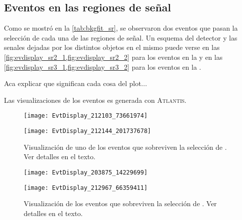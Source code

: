 \subsection{Eventos en las regiones de señal}

Como se mostró en la \cref{tab:bkgfit_sr}, se observaron dos eventos que pasan la selección de cada una de las regiones de
señal.
Un esquema del detector y las senales dejadas por los distintos objetos en el mismo puede verse en las
\cref{fig:evdisplay_sr2_1,fig:evdisplay_sr2_2} para los eventos en la {\SRL} y en las
\cref{fig:evdisplay_sr3_1,fig:evdisplay_sr3_2} para los eventos en la {\SRH}.

Aca explicar que significan cada cosa del plot...


Las visualizaciones
de los eventos es generada con \textsc{Atlantis}\cite{atlantis}.


\begin{figure}[!htbp]
  \begin{center}

    \texttt{[image: EvtDisplay\_212103\_73661974]}

    \vspace{1cm}

    \texttt{[image: EvtDisplay\_212144\_201737678]}

    \caption{Visualización de uno de los eventos que sobreviven la selección de {\SRL}. Ver detalles en el texto.} %
    \label{fig:evdisplay_sr2_1}
  \end{center}
\end{figure}


\begin{figure}[!htbp]
  \begin{center}

    \texttt{[image: EvtDisplay\_203875\_14229699]}

    \vspace{1cm}

    \texttt{[image: EvtDisplay\_212967\_66359411]}

  \caption{Visualización de los eventos que sobreviven la selección de {\SRH}. Ver detalles en el texto.} %
  \label{fig:evdisplay_sr3_1}
  \end{center}
\end{figure}


